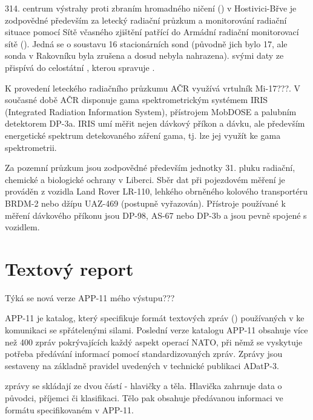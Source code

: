 	 314. centrum výstrahy proti zbraním hromadného ničení () v Hostivici-Břve je zodpovědné především za letecký radiační průzkum a monitorování radiační situace pomocí Sítě včasného zjištění patřící do Armádní radiační monitorovací sítě (). Jedná se o soustavu 16 stacionárních sond (původně jich bylo 17, ale sonda v Rakovníku byla zrušena a dosud nebyla nahrazena).  svými daty ze  přispívá do celostátní , kterou spravuje .
	 
	 K provedení leteckého radiačního průzkumu AČR využívá vrtulník Mi-17???. V současné době AČR disponuje gama spektrometrickým systémem IRIS (Integrated Radiation Information System), přístrojem MobDOSE a palubním detektorem DP-3a. IRIS umí měřit nejen dávkový příkon a dávku, ale především energetické spektrum detekovaného záření gama, tj. lze jej využít ke gama spektrometrii.
	
	 Za pozemní průzkum jsou zodpovědné především jednotky 31. pluku radiační, chemické a biologické ochrany v Liberci. Sběr dat při pojezdovém měření je prováděn z vozidla Land Rover LR-110, lehkého obrněného kolového transportéru BRDM-2 nebo džípu UAZ-469 (postupně vyřazován). Přístroje používané k měření dávkového příkonu jsou DP-98, AS-67 nebo DP-3b a jsou pevně spojené s vozidlem. 
	 
	 
\section{Textový report}

Týká se nová verze APP-11 mého výstupu???

APP-11 je katalog, který specifikuje formát textových zpráv () používaných v  ke komunikaci se spřátelenými silami. Poslední verze katalogu APP-11 obsahuje více než 400 zpráv pokrývajících každý aspekt operací NATO, při němž se vyskytuje potřeba předávání informací pomocí standardizovaných zpráv. Zprávy jsou sestaveny na základně pravidel uvedených v technické publikaci ADatP-3. 

 zprávy se skládají ze dvou částí - hlavičky a těla. Hlavička zahrnuje data o původci, příjemci či klasifikaci. Tělo pak obsahuje předávanou informaci ve formátu specifikovaném v APP-11. 

